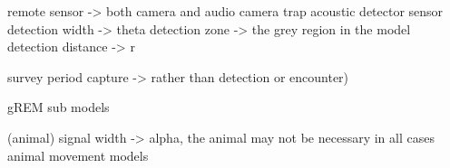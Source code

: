 remote sensor -> both camera and audio
camera trap
acoustic detector
sensor detection width -> theta
detection zone -> the grey region in the model 
detection distance -> r

survey period
capture -> rather than detection or encounter)

gREM sub models

(animal) signal width -> alpha, the animal may not be necessary in all cases
animal movement models 


